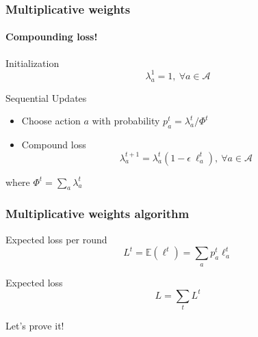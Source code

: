 \documentclass{beamer}
\begin{document}
\begin{frame}
    \frametitle{Multiplicative weights}
    \framesubtitle{Compounding loss!}

    \begin{block}{Initialization}
        \begin{equation*}
            \lambda_a^1 = 1,~\forall a\in\mathcal{A}
        \end{equation*}
    \end{block}

    \begin{block}{Sequential Updates}
        \begin{itemize}
            \item Choose action $a$ with probability $p_a^t = \lambda_a^t /
                \Phi^t$
            \item Compound loss
                \begin{equation*}
                    \lambda_a^{t+1} = \lambda_a^t (1 -
                    \epsilon~\ell_a^t),~\forall a\in\mathcal{A}
                \end{equation*}
        \end{itemize}
        where $\Phi^t = \sum_a \lambda_a^t$
    \end{block}

\end{frame}

\begin{frame}
    \frametitle{Multiplicative weights algorithm}

    \begin{block}{Expected loss per round}
        \begin{equation*}
            L^t = \mathbb{E}(\ell^t) = \sum_a p_a^t \ell_a^t
        \end{equation*}
    \end{block}

    \begin{block}{Expected loss}
        \begin{equation*}
            L = \sum_{t} L^t
        \end{equation*}
    \end{block}

    Let's prove it!

\end{frame}
\end{document}
